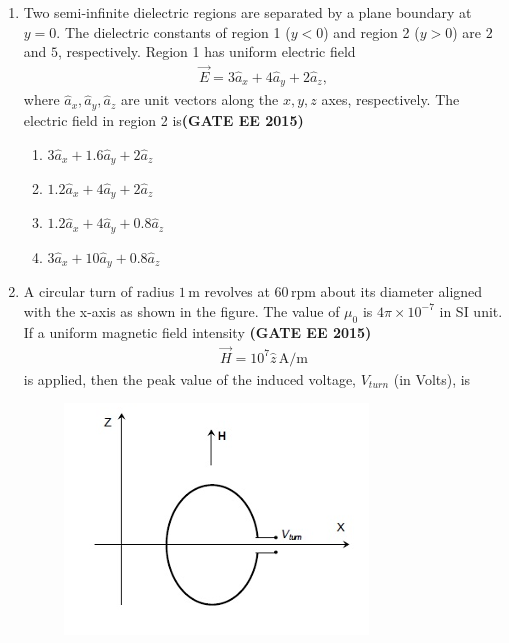 \documentclass[a4paper,12pt]{exam}
\theoremstyle{remark}
\begin{document}
\begin{enumerate}
\item Two semi-infinite dielectric regions are separated by a plane boundary at $y = 0$. 
The dielectric constants of region 1 ($y < 0$) and region 2 ($y > 0$) are $2$ and $5$, respectively. 
Region 1 has uniform electric field 
\begin{align}
\vec{E} = 3\hat{a}_x + 4\hat{a}_y + 2\hat{a}_z,
\end{align}
where $\hat{a}_x, \hat{a}_y, \hat{a}_z$ are unit vectors along the $x, y, z$ axes, respectively. 
The electric field in region 2 is\hfill{\textbf{(GATE EE 2015)}}

\begin{multicols}{2}
\begin{enumerate}
\item $3\hat{a}_x + 1.6\hat{a}_y + 2\hat{a}_z$
\item $1.2\hat{a}_x + 4\hat{a}_y + 2\hat{a}_z$
\item $1.2\hat{a}_x + 4\hat{a}_y + 0.8\hat{a}_z$
\item $3\hat{a}_x + 10\hat{a}_y + 0.8\hat{a}_z$
\end{enumerate}
\end{multicols}

\item A circular turn of radius $1 \, \text{m}$ revolves at $60 \, \text{rpm}$ about its diameter aligned with the x-axis as shown in the figure. 
The value of $\mu_0$ is $4\pi \times 10^{-7}$ in SI unit. If a uniform magnetic field intensity \hfill{\textbf{(GATE EE 2015)}}
\begin{align}
\vec{H} = 10^7 \hat{z} \, \text{A/m}
\end{align}
is applied, then the peak value of the induced voltage, $V_{turn}$ (in Volts), is
\begin{figure}[H]
    \centering
    \includegraphics[width=0.5\columnwidth]{figs/2Q 20.png}
    \caption{}
    \label{fig:placeholder}
\end{figure}


\end{enumerate}
\end{document}
